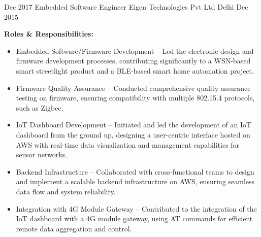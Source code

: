 \begin{experiences}
  \experience
  {Dec 2017}   %
  {Embedded Software Engineer}  %
  {Eigen Technologies Pvt Ltd}  %
  {Delhi}  %
  {Dec 2015}  %
  {   %
      \textbf{Roles \& Responsibilities:}
      \begin{itemize}
          \item Embedded Software/Firmware Development – Led the electronic design and firmware development processes, contributing significantly to a WSN-based smart streetlight product and a BLE-based smart home automation project.
          \item Firmware Quality Assurance – Conducted comprehensive quality assurance testing on firmware, ensuring compatibility with multiple 802.15.4 protocols, such as Zigbee.
          \item IoT Dashboard Development – Initiated and led the development of an IoT dashboard from the ground up, designing a user-centric interface hosted on AWS with real-time data visualization and management capabilities for sensor networks.
          \item Backend Infrastructure – Collaborated with cross-functional teams to design and implement a scalable backend infrastructure on AWS, ensuring seamless data flow and system reliability.
          \item Integration with 4G Module Gateway – Contributed to the integration of the IoT dashboard with a 4G module gateway, using AT commands for efficient remote data aggregation and control.
      \end{itemize}    
  }
  {}  %


    
\end{experiences}